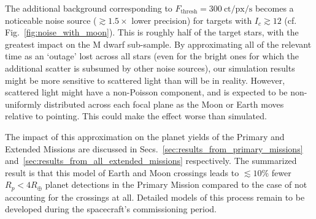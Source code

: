 The additional background corresponding to $F_\mathrm{thresh}=300\ 
\mathrm{ct/px/s}$ becomes a noticeable noise source ($\gtrsim 1.5\times$ lower
precision) for targets with $I_c \gtrsim 12$ (cf.
Fig.~\ref{fig:noise_with_moon}).
This is roughly half of the target stars, with the greatest impact on the M 
dwarf sub-sample.
By approximating all of the relevant time as an `outage' lost across all stars 
(even for the bright ones for which the additional scatter is subsumed by 
other noise sources), our simulation results might be more sensitive to 
scattered light than \tess will be in reality.
However, scattered light might have a non-Poisson component, and is   expected 
to 
be non-uniformly distributed across each focal plane as the Moon or Earth 
moves relative to \tesss pointing.
This could make the effect worse than simulated.

The impact of this approximation on the planet yields of the Primary and 
Extended Missions are discussed in 
Secs.~\ref{sec:results_from_primary_missions} and~\ref{sec:results_from_all_extended_missions}
 respectively.
The summarized result is that this model of Earth and Moon crossings leads to 
$\lesssim 10\%$ fewer $R_p<4R_\oplus$ planet detections in the Primary Mission 
compared to the case of 
not accounting for the crossings at all.
Detailed models of this process remain to be developed during the spacecraft's 
commissioning period.



